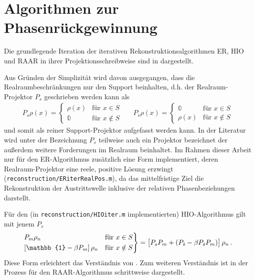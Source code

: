 \chapter{Algorithmen zur Phasenrückgewinnung}
\label{chap:anhang_algos}
Die grundlegende Iteration der iterativen Rekonstruktionsalgorithmen ER, HIO und RAAR in ihrer Projektionsschreibweise sind in  dargestellt.

 Aus Gründen der Simplizität wird davon ausgegangen, dass die Realraumbeschränkungen nur den Support beinhalten, d.h. der Realraum-Projektor $P_s$ geschrieben werden kann als 
 \begin{align}
 P_s\rho (x)=\begin{cases}
  \rho (x)  &\text{für } x\in S\\
  \mathbb{0}  &\text{für }x\notin S
 \end{cases}&&
   P_{\bar{s}}\rho (x)=\begin{cases}
   	\mathbb{0} &\text{für } x\in S\\
   	\rho (x)   &\text{für }x\notin S
   	\end{cases}
 \end{align}
  und somit als reiner Support-Projektor aufgefasst werden kann. In der Literatur wird unter der Bezeichnung $P_s$ teilweise auch ein Projektor bezeichnet der außerdem weitere Forderungen im Realraum beinhaltet. Im Rahmen dieser Arbeit nur für den ER-Algorithmus zusätzlich eine Form implementiert, deren Realraum-Projektor eine reele, positive Lösung erzwingt (\texttt{reconstruction/ERiterRealPos.m}), da das mittelfristige Ziel die Rekonstruktion der Austrittswelle inklusive der relativen Phasenbeziehungen darstellt.
 
	Für den (in \texttt{reconstruction/HIOiter.m} implementierten) HIO-Algorithmus gilt mit jenem $P_s$ 
	\begin{align*}
	\begin{rcases}	
	P_m\rho_n  &\text{für } x\in S\\
	\left[\mathbb{1}-\beta P_m\right]\rho_n &\text{für } x\notin S
	\end{rcases}	
	=\left[P_sP_m+\left(P_{\bar{s}}-\beta P_{\bar{s}} P_m\right)\right]\rho_n
	\,.
	\end{align*}
	Diese Form erleichtert das Verständnis von . Zum weiteren Verständnis ist in  der Prozess für den RAAR-Algorithmus schrittweise dargestellt.
	
